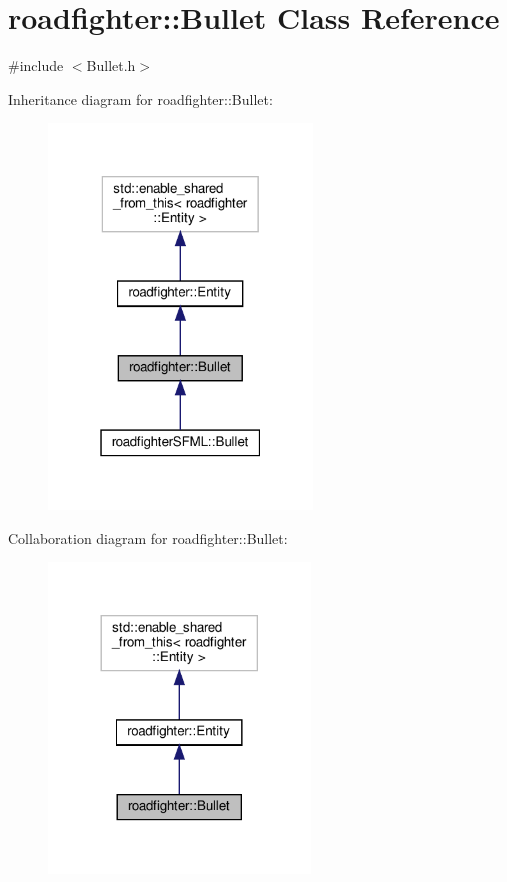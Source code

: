 \hypertarget{classroadfighter_1_1Bullet}{}\section{roadfighter\+:\+:Bullet Class Reference}
\label{classroadfighter_1_1Bullet}


{\ttfamily \#include $<$Bullet.\+h$>$}



Inheritance diagram for roadfighter\+:\+:Bullet\+:\nopagebreak
\begin{figure}[H]
\begin{center}
\leavevmode
\includegraphics[width=199pt]{classroadfighter_1_1Bullet__inherit__graph}
\end{center}
\end{figure}


Collaboration diagram for roadfighter\+:\+:Bullet\+:\nopagebreak
\begin{figure}[H]
\begin{center}
\leavevmode
\includegraphics[width=197pt]{classroadfighter_1_1Bullet__coll__graph}
\end{center}
\end{figure}
